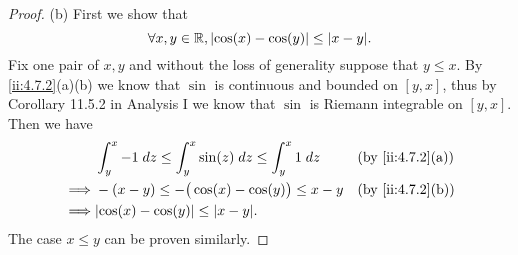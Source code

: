 \begin{proof}{(b)}
  First we show that
  \[
    \forall x, y \in \R, \abs{\cos(x) - \cos(y)} \leq \abs{x - y}.
  \]
  Fix one pair of \(x, y\) and without the loss of generality suppose that \(y \leq x\).
  By \cref{ii:4.7.2}(a)(b) we know that \(\sin\) is continuous and bounded on \([y, x]\), thus by Corollary 11.5.2 in Analysis I we know that \(\sin\) is Riemann integrable on \([y, x]\).
  Then we have
  \begin{align*}
             & \int_y^x -1 \; dz \leq \int_y^x \sin(z) \; dz \leq \int_y^x 1 \; dz &  & \by{ii:4.7.2}[a] \\
    \implies & -(x - y) \leq -\big(\cos(x) - \cos(y)\big) \leq x - y               &  & \by{ii:4.7.2}[b] \\
    \implies & \abs{\cos(x) - \cos(y)} \leq \abs{x - y}.
  \end{align*}
  The case \(x \leq y\) can be proven similarly.


\end{proof}
